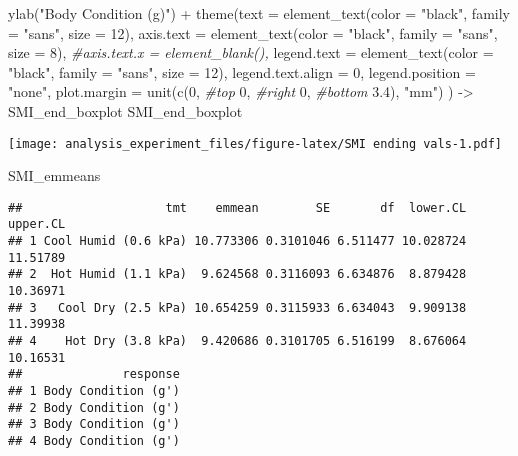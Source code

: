 \documentclass[
]{article}
\newenvironment{Shaded}{\begin{snugshade}}{\end{snugshade}}
\newcommand{\AttributeTok}[1]{\textcolor[rgb]{0.77,0.63,0.00}{#1}}
\newcommand{\CommentTok}[1]{\textcolor[rgb]{0.56,0.35,0.01}{\textit{#1}}}
\newcommand{\DecValTok}[1]{\textcolor[rgb]{0.00,0.00,0.81}{#1}}
\newcommand{\FloatTok}[1]{\textcolor[rgb]{0.00,0.00,0.81}{#1}}
\newcommand{\FunctionTok}[1]{\textcolor[rgb]{0.00,0.00,0.00}{#1}}
\newcommand{\NormalTok}[1]{#1}
\newcommand{\OtherTok}[1]{\textcolor[rgb]{0.56,0.35,0.01}{#1}}
\newcommand{\SpecialCharTok}[1]{\textcolor[rgb]{0.00,0.00,0.00}{#1}}
\newcommand{\StringTok}[1]{\textcolor[rgb]{0.31,0.60,0.02}{#1}}
\begin{document}
\begin{Shaded}
\begin{Highlighting}[]
  \FunctionTok{ylab}\NormalTok{(}\StringTok{"Body Condition (g\textquotesingle{})"}\NormalTok{) }\SpecialCharTok{+} 
  \FunctionTok{theme}\NormalTok{(}\AttributeTok{text =} \FunctionTok{element\_text}\NormalTok{(}\AttributeTok{color =} \StringTok{"black"}\NormalTok{, }
                            \AttributeTok{family =} \StringTok{"sans"}\NormalTok{, }
                            \AttributeTok{size =} \DecValTok{12}\NormalTok{),}
        \AttributeTok{axis.text =} \FunctionTok{element\_text}\NormalTok{(}\AttributeTok{color =} \StringTok{"black"}\NormalTok{, }
                                 \AttributeTok{family =} \StringTok{"sans"}\NormalTok{, }
                                 \AttributeTok{size =} \DecValTok{8}\NormalTok{),}
        \CommentTok{\#axis.text.x = element\_blank(),}
        \AttributeTok{legend.text =} \FunctionTok{element\_text}\NormalTok{(}\AttributeTok{color =} \StringTok{"black"}\NormalTok{, }
                                 \AttributeTok{family =} \StringTok{"sans"}\NormalTok{, }
                                 \AttributeTok{size =} \DecValTok{12}\NormalTok{),}
        \AttributeTok{legend.text.align =} \DecValTok{0}\NormalTok{,}
        \AttributeTok{legend.position =} \StringTok{"none"}\NormalTok{,}
        \AttributeTok{plot.margin =} \FunctionTok{unit}\NormalTok{(}\FunctionTok{c}\NormalTok{(}\DecValTok{0}\NormalTok{, }\CommentTok{\#top}
                              \DecValTok{0}\NormalTok{, }\CommentTok{\#right}
                              \DecValTok{0}\NormalTok{, }\CommentTok{\#bottom}
                              \FloatTok{3.4}\NormalTok{), }\StringTok{"mm"}\NormalTok{)}
\NormalTok{        ) }\OtherTok{{-}\textgreater{}}\NormalTok{ SMI\_end\_boxplot}
\NormalTok{SMI\_end\_boxplot}
\end{Highlighting}
\end{Shaded}

\texttt{[image: analysis\_experiment\_files/figure-latex/SMI ending vals-1.pdf]}

\begin{Shaded}
\begin{Highlighting}[]
\NormalTok{SMI\_emmeans}
\end{Highlighting}
\end{Shaded}

\begin{verbatim}
##                    tmt    emmean        SE       df  lower.CL upper.CL
## 1 Cool Humid (0.6 kPa) 10.773306 0.3101046 6.511477 10.028724 11.51789
## 2  Hot Humid (1.1 kPa)  9.624568 0.3116093 6.634876  8.879428 10.36971
## 3   Cool Dry (2.5 kPa) 10.654259 0.3115933 6.634043  9.909138 11.39938
## 4    Hot Dry (3.8 kPa)  9.420686 0.3101705 6.516199  8.676064 10.16531
##              response
## 1 Body Condition (g')
## 2 Body Condition (g')
## 3 Body Condition (g')
## 4 Body Condition (g')
\end{verbatim}
\end{document}
